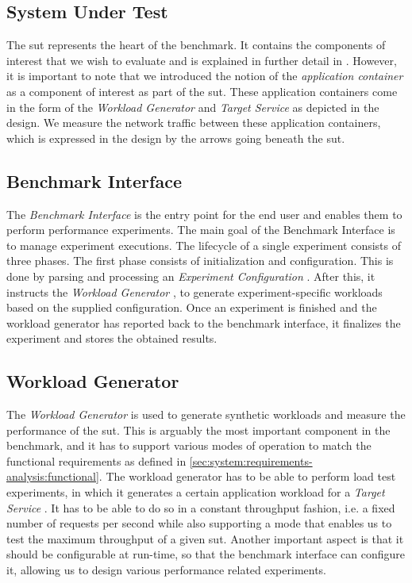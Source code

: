 \subsection{System Under Test}
The \gls{sut}  represents the heart of the benchmark. It contains the components of interest that we wish to evaluate and is explained in further detail in \label{sec:system:sut}. However, it is important to note that we introduced the notion of the \textit{application container} as a component of interest as part of the \gls{sut}. These application containers come in the form of the \textit{Workload Generator} and \textit{Target Service}  as depicted in the design. We measure the network traffic between these application containers, which is expressed in the design by the arrows going beneath the \gls{sut}.

\subsection{Benchmark Interface}
The \textit{Benchmark Interface}  is the entry point for the end user and enables them to perform performance experiments. The main goal of the Benchmark Interface is to manage experiment executions. The lifecycle of a single experiment consists of three phases. The first phase consists of initialization and configuration. This is done by parsing and processing an \textit{Experiment Configuration} . After this, it instructs the \textit{Workload Generator} , to generate experiment-specific workloads based on the supplied configuration. Once an experiment is finished and the workload generator has reported back to the benchmark interface, it finalizes the experiment and stores the obtained results.

\subsection{Workload Generator}
The \textit{Workload Generator}  is used to generate synthetic workloads and measure the performance of the \gls{sut}. This is arguably the most important component in the benchmark, and it has to support various modes of operation to match the functional requirements as defined in \cref{sec:system:requirements-analysis:functional}. The workload generator has to be able to perform load test experiments, in which it generates a certain application workload for a \textit{Target Service} . It has to be able to do so in a constant throughput fashion, i.e. a fixed number of requests per second while also supporting a mode that enables us to test the maximum throughput of a given \gls{sut}. Another important aspect is that it should be configurable at run-time, so that the benchmark interface  can configure it, allowing us to design various performance related experiments. 

